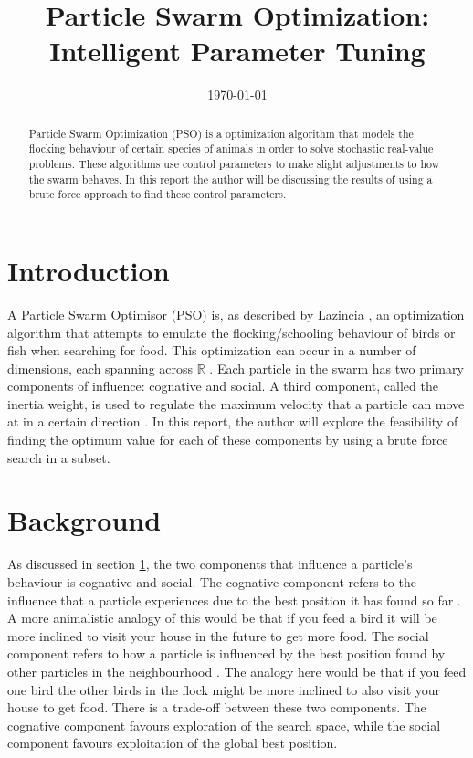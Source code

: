\documentclass[hidelinks,english,conference]{IEEEtran}
\date{\today}
\begin{document}
\title{Particle Swarm Optimization: Intelligent Parameter Tuning}
\author{
}
\maketitle

\begin{abstract}
Particle Swarm Optimization (PSO) is a optimization algorithm that models the flocking behaviour of certain species of animals in order to solve stochastic real-value problems. These algorithms use control parameters to make slight adjustments to how the swarm behaves. In this report the author will be discussing the results of using a brute force approach to find these control parameters.
\end{abstract}

\IEEEpeerreviewmaketitle

\section{Introduction}\label{intoductionSection}
A Particle Swarm Optimisor (PSO) is, as described by Lazincia \cite{lazinica2009particle}, an optimization algorithm that attempts to emulate the flocking/schooling behaviour of birds or fish when searching for food. This optimization can occur in a number of dimensions, each spanning across $\mathbb{R}$ \cite{kennedy1997discrete}. Each particle in the swarm has two primary components of influence: cognative and social. A third component, called the inertia weight, is used to regulate the maximum velocity that a particle can move at in a certain direction \cite{eberhart2000comparing}. In this report, the author will explore the feasibility of finding the optimum value for each of these components by using a brute force search in a subset.

\section{Background}
As discussed in section \ref{intoductionSection}, the two components that influence a particle's behaviour is cognative and social. The cognative component refers to the influence that a particle experiences due to the best position it has found so far \cite{shi1998modified}. A more animalistic analogy of this would be that if you feed a bird it will be more inclined to visit your house in the future to get more food. The social component refers to how a particle is influenced by the best position found by other particles in the neighbourhood \cite{shi1998modified}. The analogy here would be that if you feed one bird the other birds in the flock might be more inclined to also visit your house to get food. There is a trade-off between these two components. The cognative component favours exploration of the search space, while the social component favours exploitation of the global best position.
\end{document}
